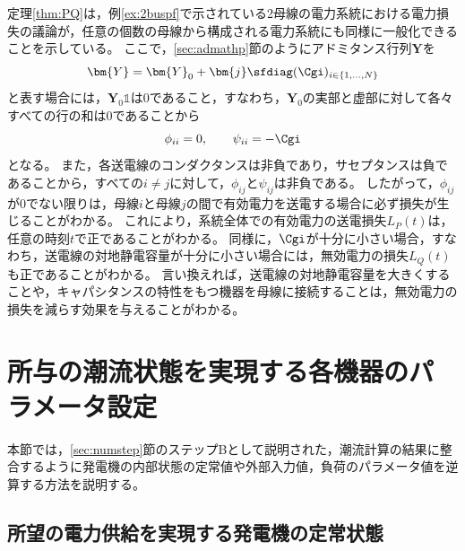 \documentclass[tombow,dvipdfmx]{corona-a5-1.1}
\begin{document}
定理\ref{thm:PQ}は，例\ref{ex:2buspf}で示されている2母線の電力系統における電力損失の議論が，任意の個数の母線から構成される電力系統にも同様に一般化できることを示している。
ここで，\ref{sec:admathp}節のようにアドミタンス行列$\bm{Y}$を
\[
\bm{Y}=\bm{Y}_0 + \bm{j} \sfdiag(\Cgi)_{i\in \{1,\ldots,N\} }
\]
と表す場合には，$\bm{Y}_0 \mathds{1}$は0であること，すなわち，$\bm{Y}_0$の実部と虚部に対して各々すべての行の和は0であることから
\[
\phi_{ii}=0,\qquad
\psi_{ii}= - \Cgi
\]
となる。
また，各送電線のコンダクタンスは非負であり，サセプタンスは負であることから，すべての$i\neq j$に対して，$\phi_{ij} $と$\psi_{ij}$は非負である。
したがって，$\phi_{ij}$が0でない限りは，母線$i$と母線$j$の間で有効電力を送電する場合に必ず損失が生じることがわかる。
これにより，系統全体での有効電力の送電損失$L_P(t)$は，任意の時刻$t$で正であることがわかる。
同様に，$\Cgi$が十分に小さい場合，すなわち，送電線の対地静電容量が十分に小さい場合には，無効電力の損失$L_Q(t)$も正であることがわかる。
言い換えれば，送電線の対地静電容量を大きくすることや，キャパシタンスの特性をもつ機器を母線に接続することは，無効電力の損失を減らす効果を与えることがわかる。



\section{所与の潮流状態を実現する各機器のパラメータ設定}\label{sec:paradef}

本節では，\ref{sec:numstep}節のステップBとして説明された，潮流計算の結果に整合するように発電機の内部状態の定常値や外部入力値，負荷のパラメータ値を逆算する方法を説明する。


\subsection{所望の電力供給を実現する発電機の定常状態}\label{sec:stagen}
\end{document}
